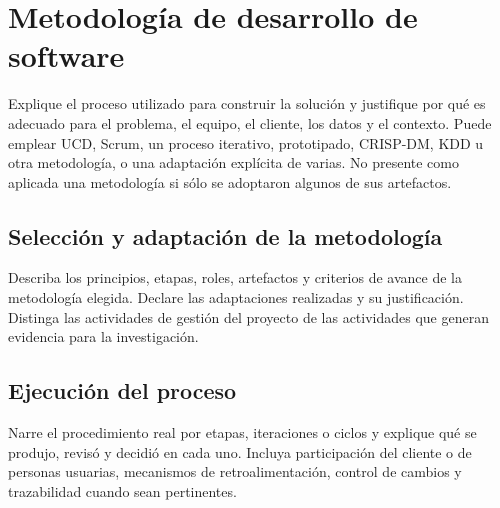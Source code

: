 
\section{Metodología de desarrollo de software}

Explique el proceso utilizado para construir la solución y justifique por qué
es adecuado para el problema, el equipo, el cliente, los datos y el contexto.
Puede emplear UCD, Scrum, un proceso iterativo, prototipado, CRISP-DM, KDD u otra
metodología, o una adaptación explícita de varias. No presente como aplicada una
metodología si sólo se adoptaron algunos de sus artefactos.

\subsection{Selección y adaptación de la metodología}

Describa los principios, etapas, roles, artefactos y criterios de avance de la
metodología elegida. Declare las adaptaciones realizadas y su justificación.
Distinga las actividades de gestión del proyecto de las actividades que generan
evidencia para la investigación.

\subsection{Ejecución del proceso}

Narre el procedimiento real por etapas, iteraciones o ciclos y explique qué se
produjo, revisó y decidió en cada uno. Incluya participación del cliente o de
personas usuarias, mecanismos de retroalimentación, control de cambios y
trazabilidad cuando sean pertinentes.


